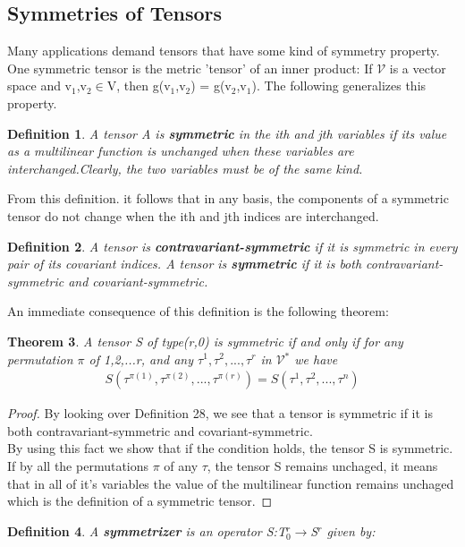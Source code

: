 \documentclass[12pt,a4paper]{article}
\newtheorem{thm}{Theorem}
\newtheorem{defn}[thm]{Definition}
\begin{document}
\subsection{Symmetries of Tensors}
Many applications demand tensors that have some kind of symmetry property. One symmetric tensor is the metric 'tensor' of an inner product: If $\mathcal{V}$ is a vector space  and v$_1$,v$_2$$\in$V, then g(v$_1$,v$_2$) = g(v$_2$,v$_1$). The following generalizes this property.\\
\begin{defn}
A tensor A is \textbf{symmetric} in the ith and jth variables if its value as a multilinear function is unchanged when these variables are interchanged.Clearly, the two variables must be of the same kind.
\end{defn}
\hspace{1cm} From this definition. it follows that in any basis, the components of a symmetric tensor do not change when the ith and jth indices are interchanged.
\begin{defn}
A tensor is \textbf{contravariant-symmetric} if it is symmetric in every pair of its covariant indices. A tensor is \textbf{symmetric} if it is both contravariant-symmetric and covariant-symmetric.
\end{defn}
\hspace{1cm} An immediate consequence of this definition is the following theorem:
\begin{thm}
A tensor S of type(r,0) is symmetric if and only if for any permutation $\pi$ of 1,2,...r, and any $\tau^1,\tau^2,...,\tau^r$ in $\mathcal{V}$$^*$ we have \begin{align*}
S(\tau^{\pi(1)},\tau^{\pi(2)},...,\tau^{\pi(r)}) = S(\tau^1,\tau^2,...,\tau^n)
\end{align*}
\end{thm}
\begin{proof}
By looking over Definition 28, we see that a tensor is symmetric if it is both contravariant-symmetric and covariant-symmetric. \\
By using this fact we show that if the condition holds, the tensor S is symmetric.\\
If by all the permutations $\pi$ of any $\tau$, the tensor S remains unchaged, it means that in all of it's variables the value of the multilinear function remains unchaged which is the definition of a symmetric tensor.
\end{proof}
\begin{defn}
A \textbf{symmetrizer} is an operator S:T$_0^r\to$S$^r$ given by:\\

\end{defn}$$
\end{document}
